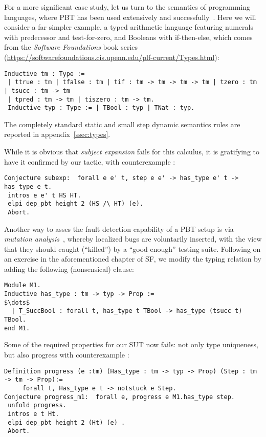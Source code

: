 For a more significant case study, let us turn to the semantics of
programming languages, where PBT has been used extensively and
successfully~\cite{Klein12}. Here we will consider a far simpler example,
a typed arithmetic language featuring numerals with predecessor  and test-for-zero, 
and Booleans with if-then-else, which comes from the \emph{Software Foundations} book series (\url{https://softwarefoundations.cis.upenn.edu/plf-current/Types.html}):
\begin{lstlisting}
Inductive tm : Type :=
 | ttrue : tm | tfalse : tm | tif : tm -> tm -> tm -> tm | tzero : tm | tsucc : tm -> tm
 | tpred : tm -> tm | tiszero : tm -> tm.
 Inductive typ : Type := | TBool : typ | TNat : typ.
\end{lstlisting}
The completely standard static and small step dynamic semantics rules are
reported in appendix~\ref{ssec:types}.

While it is obvious that \emph{subject expansion} fails for this calculus, it is gratifying to have it confirmed by our tactic, with counterexample :
\begin{lstlisting}
Conjecture subexp:  forall e e' t, step e e' -> has_type e' t -> has_type e t. 
 intros e e' t HS HT.
 elpi dep_pbt height 2 (HS /\ HT) (e).
 Abort.
\end{lstlisting}


Another way to asses the fault detection capability of a PBT setup is via \emph{mutation analysis}~\cite{CavadaCM20}, whereby localized bugs are voluntarily inserted, with the view that they should caught (``killed'') by a ``good enough'' testing suite. Following on  an exercise in the aforementioned chapter of SF, we modify the typing relation by adding the following (nonsensical)  clause:

\begin{lstlisting}
Module M1.
Inductive has_type : tm -> typ -> Prop :=
$\dots$
  | T_SuccBool : forall t, has_type t TBool -> has_type (tsucc t) TBool.
end M1.
\end{lstlisting}
Some of the required properties for our SUT now fails: not
only type uniqueness, but also progress with counterexample :
\begin{lstlisting}
Definition progress (e :tm) (Has_type : tm -> typ -> Prop) (Step : tm -> tm -> Prop):= 
     forall t, Has_type e t -> notstuck e Step.
Conjecture progress_m1:  forall e, progress e M1.has_type step.
 unfold progress.
 intros e t Ht.    
 elpi dep_pbt height 2 (Ht) (e) .
 Abort.
\end{lstlisting}

